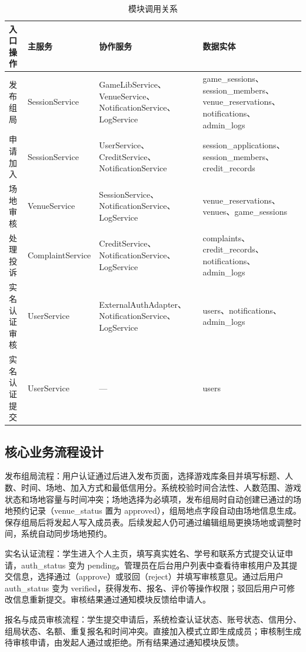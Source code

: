 \documentclass[a4paper]{article}
\begin{document}
\begin{table}[H]
  \centering
  \begin{tabularx}{\linewidth}{P{2.7cm} P{3.2cm} P{5.2cm} Y}
    \toprule
    入口操作 & 主服务 & 协作服务 & 数据实体 \\
    \midrule
    发布组局 & SessionService & GameLibService、VenueService、NotificationService、LogService & game\_sessions、session\_members、venue\_reservations、notifications、admin\_logs \\
    申请加入 & SessionService & UserService、CreditService、NotificationService & session\_applications、session\_members、credit\_records \\
    场地审核 & VenueService & SessionService、NotificationService、LogService & venue\_reservations、venues、game\_sessions \\
    处理投诉 & ComplaintService & CreditService、NotificationService、LogService & complaints、credit\_records、notifications、admin\_logs \\
    实名认证审核 & UserService & ExternalAuthAdapter、NotificationService、LogService & users、notifications、admin\_logs \\
    实名认证提交 & UserService & — & users \\
    \bottomrule
  \end{tabularx}
  \caption{模块调用关系}
\end{table}

\subsection{核心业务流程设计}

发布组局流程：用户认证通过后进入发布页面，选择游戏库条目并填写标题、人数、时间、场地、加入方式和最低信用分。系统校验时间合法性、人数范围、游戏状态和场地容量与时间冲突；场地选择为必填项，发布组局时自动创建已通过的场地预约记录（venue\_status 置为 approved），组局地点字段自动由场地信息生成。保存组局后将发起人写入成员表。后续发起人仍可通过编辑组局更换场地或调整时间，系统自动同步场地预约。

实名认证流程：学生进入个人主页，填写真实姓名、学号和联系方式提交认证申请，auth\_status 变为 pending。管理员在后台用户列表中查看待审核用户及其提交信息，选择通过（approve）或驳回（reject）并填写审核意见。通过后用户 auth\_status 变为 verified，获得发布、报名、评价等操作权限；驳回后用户可修改信息重新提交。审核结果通过通知模块反馈给申请人。

报名与成员审核流程：学生提交申请后，系统检查认证状态、账号状态、信用分、组局状态、名额、重复报名和时间冲突。直接加入模式立即生成成员；审核制生成待审核申请，由发起人通过或拒绝。所有结果通过通知模块反馈。
\end{document}

